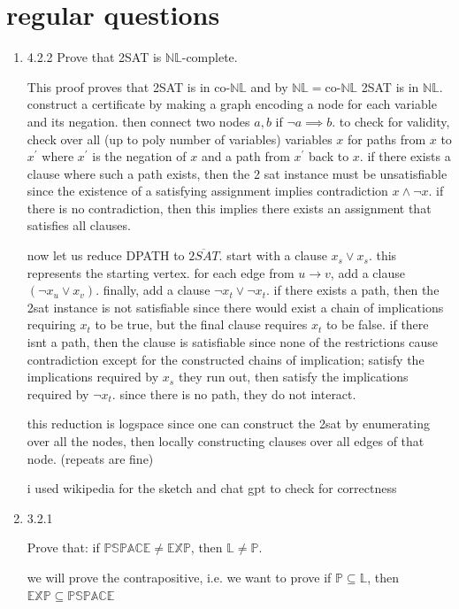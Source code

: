 \documentclass{article}
\newcommand{\LSPACE}{\mathbb{L}}
\newcommand{\PSPACE}{\mathbb{PSPACE}}
\newcommand{\NL}{\mathbb{NL}}
\newcommand{\coNL}{\textrm{co-}\mathbb{NL}}
\newcommand{\EXP}{\mathbb{EXP}}
\newcommand{\PTIME}{\mathbb{P}}
\begin{document}
\section{regular questions}
\begin{enumerate}
    \item 4.2.2 Prove that 2SAT is $\NL$-complete.
    
    This proof proves that 2SAT is in \(\coNL\) and by \(\NL = \text{co-}\NL\) 2SAT is in \(\NL\).
    construct a certificate by making a graph encoding a node for each variable and its negation. then connect two nodes \(a,b\) if \(\neg a\implies b\). to check for validity, check over all (up to poly number of variables) variables \(x\) for paths from \(x\) to \(x^\prime\) where \(x^\prime \) is the negation of \(x\) and a path from \(x^\prime\) back to \(x\). if there exists a clause where such a path exists, then the 2 sat instance must be unsatisfiable since the existence of a satisfying assignment implies contradiction \(x\land \neg x\). if there is no contradiction, then this implies there exists an assignment that satisfies all clauses. 

    now let us reduce DPATH to \(\overline{2SAT}\). start with a clause \(x_s\lor x_s\). this represents the starting vertex. for each edge from \(u\to v\), add a clause \((\neg x_u \lor x_v)\). finally, add a clause \(\neg x_t \lor \neg x_t\). if there exists a path, then the 2sat instance is not satisfiable since there would exist a chain of implications requiring \(x_t\) to be true, but the final clause requires \(x_t\) to be false. if there isnt a path, then the clause is satisfiable since none of the restrictions cause contradiction except for the constructed chains of implication; satisfy the implications required by \(x_s\) they run out, then satisfy the implications required by \(\neg x_t\). since there is no path, they do not interact. 

    this reduction is logspace since one can construct the 2sat by enumerating over all the nodes, then locally constructing clauses over all edges of that node. (repeats are fine)

    i used wikipedia for the sketch and chat gpt to check for correctness

    \item 3.2.1
    
    Prove that: if $\PSPACE \neq \EXP$, then $\mathbb{L} \neq \PTIME$.

    


    we will prove the contrapositive, 
    i.e. we want to prove if \(\PTIME\subseteq\LSPACE\), then \(\EXP\subseteq\PSPACE\)


\end{enumerate}
\end{document}
